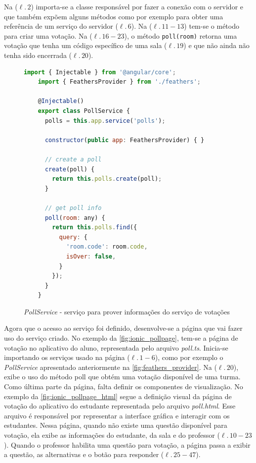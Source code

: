 Na ($\ell.\,2$) importa-se a classe responsável por fazer a conexão com o servidor e que também
expõem alguns métodos como por exemplo para obter uma referência de um serviço do servidor ($\ell.\,6$). Na ($\ell.\,11-13$)
tem-se o método para criar uma votação. Na ($\ell.\,16-23$), o método \texttt{poll(room)} retorna uma votação
que tenha um código específico de uma sala ($\ell.\,19$) e que não ainda não tenha sido encerrada ($\ell.\,20$).

\begin{figure}[!ht]
  \caption{\textit{PollService} - serviço para prover informações do serviço de votações}
  \label{fig:feathers_provider}
  \begin{lstlisting}[language=JavaScript]
    import { Injectable } from '@angular/core';
    import { FeathersProvider } from './feathers';

    @Injectable()
    export class PollService {
      polls = this.app.service('polls');

      constructor(public app: FeathersProvider) { }

      // create a poll
      create(poll) {
        return this.polls.create(poll);
      }

      // get poll info
      poll(room: any) {
        return this.polls.find({
          query: {
            'room.code': room.code,
            isOver: false,
          }
        });
      }
    }
  \end{lstlisting}
  \doautor
\end{figure}

Agora que o acesso ao serviço foi definido, desenvolve-se a página que vai
fazer uso do serviço criado. No exemplo da \autoref{fig:ionic_pollpage}, tem-se
a página de votação no aplicativo do aluno, representada pelo arquivo \textit{poll.ts}.
Inicia-se importando os serviços usado na página ($\ell.\,1-6$), como por exemplo o \textit{PollService}
apresentado anteriormente na \autoref{fig:feathers_provider}. Na ($\ell.\,20$), exibe
o uso do método poll que obtém uma votação disponível de uma turma. Como última parte
da página, falta definir os componentes de visualização. No exemplo da \autoref{fig:ionic_pollpage_html}
segue a definição visual da página de votação do aplicativo do estudante representada pelo
arquivo \textit{poll.html}. Esse arquivo é responsável por representar a interface gráfica e interagir
com os estudantes. Nessa página, quando não existe uma questão disponível para votação, ela
exibe as informações do estudante, da sala e do professor ($\ell.\,10-23$). Quando o professor habilita uma questão
para votação, a página passa a exibir a questão, as alternativas e o botão para responder ($\ell.\,25-47$).

